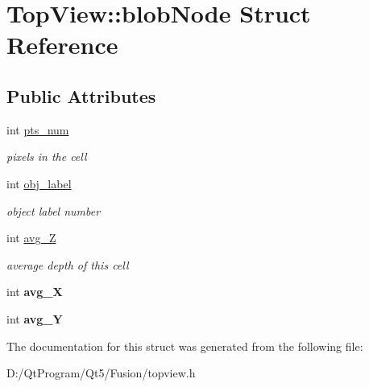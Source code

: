 \hypertarget{struct_top_view_1_1blob_node}{}\section{Top\+View\+:\+:blob\+Node Struct Reference}
\label{struct_top_view_1_1blob_node}
\subsection*{Public Attributes}
\begin{DoxyCompactItemize}
\item 
\hypertarget{struct_top_view_1_1blob_node_a515ae3055c6fa86d790db1b8652a7a48}{}int \hyperlink{struct_top_view_1_1blob_node_a515ae3055c6fa86d790db1b8652a7a48}{pts\+\_\+num}\label{struct_top_view_1_1blob_node_a515ae3055c6fa86d790db1b8652a7a48}

\begin{DoxyCompactList}\small\item\em pixels in the cell \end{DoxyCompactList}\item 
\hypertarget{struct_top_view_1_1blob_node_ab9f7984dc5d9aebace4b6e83b836fe77}{}int \hyperlink{struct_top_view_1_1blob_node_ab9f7984dc5d9aebace4b6e83b836fe77}{obj\+\_\+label}\label{struct_top_view_1_1blob_node_ab9f7984dc5d9aebace4b6e83b836fe77}

\begin{DoxyCompactList}\small\item\em object label number \end{DoxyCompactList}\item 
\hypertarget{struct_top_view_1_1blob_node_ad93cd817753b389eaa7cded6c443b612}{}int \hyperlink{struct_top_view_1_1blob_node_ad93cd817753b389eaa7cded6c443b612}{avg\+\_\+\+Z}\label{struct_top_view_1_1blob_node_ad93cd817753b389eaa7cded6c443b612}

\begin{DoxyCompactList}\small\item\em average depth of this cell \end{DoxyCompactList}\item 
\hypertarget{struct_top_view_1_1blob_node_a157fed3e6ca64d43e906353f7a6dbea9}{}int {\bfseries avg\+\_\+\+X}\label{struct_top_view_1_1blob_node_a157fed3e6ca64d43e906353f7a6dbea9}

\item 
\hypertarget{struct_top_view_1_1blob_node_ac7b9e9cd924fde86bc9d8e90b37485bc}{}int {\bfseries avg\+\_\+\+Y}\label{struct_top_view_1_1blob_node_ac7b9e9cd924fde86bc9d8e90b37485bc}

\end{DoxyCompactItemize}


The documentation for this struct was generated from the following file\+:\begin{DoxyCompactItemize}
\item 
D\+:/\+Qt\+Program/\+Qt5/\+Fusion/topview.\+h\end{DoxyCompactItemize}
